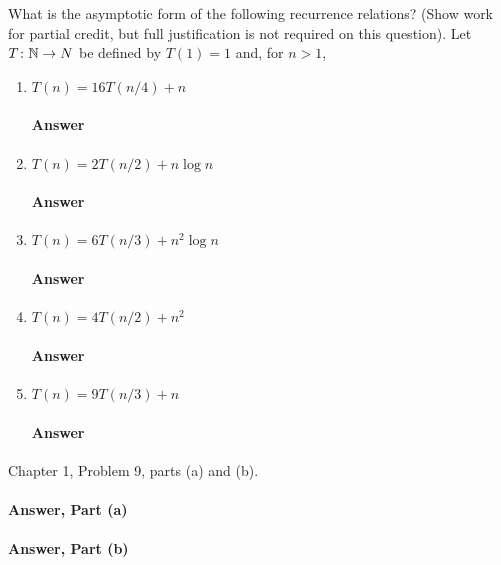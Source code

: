 \documentclass{article}
\begin{document}
What is the asymptotic form of the following recurrence
relations? (Show work for partial credit, but full justification is not required
on this question).
Let $T \colon {\mathbb N} \to N$ be defined by $T(1)=1$ and, for $n>1$,
\begin{enumerate}
    \item $T(n) = 16 T(n/4) + n$
        \paragraph{Answer} \todo{}
    \item $T(n) = 2 T(n/2) + n \log{n}$
        \paragraph{Answer} \todo{}
    \item $T(n) = 6 T(n/3) + n^2 \log{n}$
        \paragraph{Answer} \todo{}
    \item $T(n) = 4 T(n/2) + n^2$
        \paragraph{Answer} \todo{}
    \item $T(n) = 9 T(n/3) + n$
        \paragraph{Answer} \todo{}
\end{enumerate}

\collab{\todo{}}

Chapter 1, Problem 9, parts (a) and (b).

\paragraph{Answer, Part (a)}

\todo{}

\paragraph{Answer, Part (b)}

\todo{}
\end{document}
